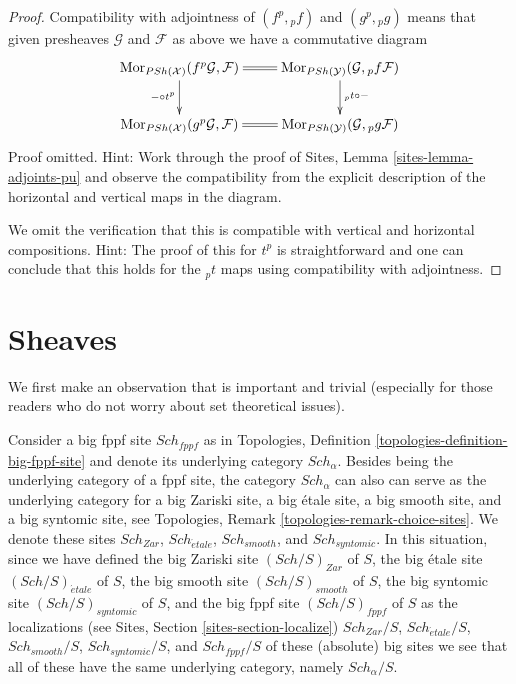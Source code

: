\documentclass{stacks-project}
\theoremstyle{plain}
\theoremstyle{definition}
\theoremstyle{remark}
\numberwithin{equation}{subsection}
\def\Sch{\mathit{Sch}}
\def\Mor{\mathop{\mathrm{Mor}}\nolimits}
\def\etale{{\acute{e}tale}}
\begin{document}
\begin{proof}
\medskip\noindent
Compatibility with adjointness of $(f^p, {}_pf)$ and $(g^p, {}_pg)$ means
that given presheaves $\mathcal{G}$ and $\mathcal{F}$ as above we have
a commutative diagram
$$
\xymatrix{
\Mor_{\textit{PSh}(\mathcal{X})}(f^p\mathcal{G}, \mathcal{F})
\ar@{=}[r] \ar[d]_{- \circ t^p} &
\Mor_{\textit{PSh}(\mathcal{Y})}(\mathcal{G}, {}_pf\mathcal{F})
\ar[d]^{{}_pt \circ -} \\
\Mor_{\textit{PSh}(\mathcal{X})}(g^p\mathcal{G}, \mathcal{F})
\ar@{=}[r] &
\Mor_{\textit{PSh}(\mathcal{Y})}(\mathcal{G}, {}_pg\mathcal{F})
}
$$
Proof omitted. Hint: Work through the proof of
Sites, Lemma \ref{sites-lemma-adjoints-pu}
and observe the compatibility from the explicit description of the
horizontal and vertical maps in the diagram.

\medskip\noindent
We omit the verification that this is compatible with vertical and horizontal
compositions. Hint: The proof of this for $t^p$ is straightforward and
one can conclude that this holds for the ${}_pt$ maps using compatibility
with adjointness.
\end{proof}







\section{Sheaves}
\label{section-sheaves}

\noindent
We first make an observation that is important and trivial
(especially for those readers who do not worry about set theoretical
issues).

\medskip\noindent
Consider a big fppf site $\Sch_{fppf}$ as in
Topologies, Definition \ref{topologies-definition-big-fppf-site}
and denote its underlying category $\Sch_\alpha$.
Besides being the underlying category of a fppf site,
the category $\Sch_\alpha$ can also can serve as the underlying
category for a big Zariski site, a big \'etale site, a big smooth site,
and a big syntomic site, see
Topologies, Remark \ref{topologies-remark-choice-sites}.
We denote these sites $\Sch_{Zar}$, $\Sch_\etale$,
$\Sch_{smooth}$, and $\Sch_{syntomic}$.
In this situation, since we have defined
the big Zariski site $(\Sch/S)_{Zar}$ of $S$,
the big \'etale site $(\Sch/S)_\etale$ of $S$,
the big smooth site $(\Sch/S)_{smooth}$ of $S$,
the big syntomic site $(\Sch/S)_{syntomic}$ of $S$, and
the big fppf site $(\Sch/S)_{fppf}$ of $S$
as the localizations (see
Sites, Section \ref{sites-section-localize})
$\Sch_{Zar}/S$, $\Sch_\etale/S$,
$\Sch_{smooth}/S$, $\Sch_{syntomic}/S$, and
$\Sch_{fppf}/S$
of these (absolute) big sites we see that all of these have the
same underlying category, namely $\Sch_\alpha/S$.
\end{document}
